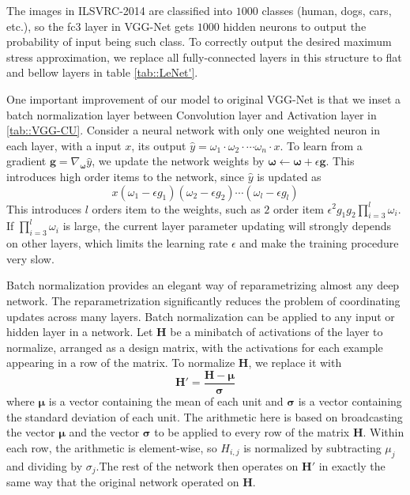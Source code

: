 The images in ILSVRC-2014 are classified into $1000$ classes (human, dogs, cars, etc.),
so the fc3 layer in VGG-Net gets $1000$ hidden neurons to output the probability of input being
such class.
To correctly output the desired maximum stress approximation,
we replace all fully-connected layers in this structure to flat and bellow layers in table
\ref{tab::LeNet'}.

One important improvement of our model to original VGG-Net is that we inset a batch normalization \cite{ioffe2015batch}
layer between Convolution layer and Activation layer in \ref{tab::VGG-CU}.
Consider a neural network with only one weighted neuron in each layer, with a input $x$, its output
$\hat{y} = \omega_1 \cdot \omega_2 \cdot \cdots \omega_n \cdot x$.
To learn from a gradient $\mathbf{g} = \nabla_{\boldsymbol{\omega}}\hat{y}$, we update the network weights by
$\boldsymbol{\omega} \gets \boldsymbol{\omega}  + \epsilon \mathbf{g}$. 
This introduces high order items to the network, since $\hat{y}$ is updated as
\begin{equation*}
x \left(\omega_1 - \epsilon g_1\right) \left(\omega_2 - \epsilon g_2\right) 
\cdots \left(\omega_l - \epsilon g_l\right)
\end{equation*}
This introduces $l$ orders item to the weights, such as $2$ order item 
$\epsilon^2 g_1 g_2 \prod_{i=3}^{l} \omega_i$.
If $\prod_{i=3}^{l} \omega_i$ is large, the current layer parameter updating will
strongly depends on other layers, which limits the learning rate $\epsilon$ and
make the training procedure very slow.

Batch normalization provides an elegant way of reparametrizing almost any deep
network. The reparametrization significantly reduces the problem of coordinating
updates across many layers. Batch normalization can be applied to any input
or hidden layer in a network. Let $\mathbf{H}$ be a minibatch of activations of the layer
to normalize, arranged as a design matrix, with the activations for each example
appearing in a row of the matrix. To normalize $\mathbf{H}$, we replace it with
\[
\mathbf{H'}=\frac{\mathbf{H}-\boldsymbol{\mu}}{\boldsymbol{\sigma}}
\]
where $\boldsymbol{\mu}$ is a vector containing the mean of each unit and $ \boldsymbol{\sigma}$ is a vector containing
the standard deviation of each unit. The arithmetic here is based on broadcasting
the vector $\boldsymbol{\mu}$ and the vector $\boldsymbol{\sigma}$ 
to be applied to every row of the matrix $\mathbf{H}$.
Within each row, the arithmetic is element-wise, so $H_{i,j}$ is normalized by subtracting $\mu_j$ 
and dividing by $\sigma_j$.The rest of the network then operates on $\mathbf{H'}$ in exactly the
same way that the original network operated on $\mathbf{H}$.

